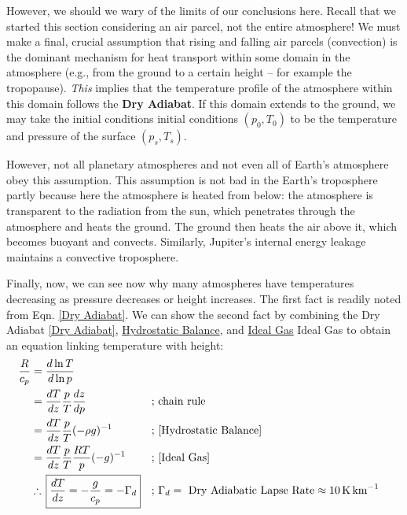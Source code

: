 However, we should we wary of the limits of our conclusions here. Recall that we started this section considering an air parcel, not the entire atmosphere! We must make a final, crucial assumption that rising and falling air parcels (convection) is the dominant mechanism for heat transport within some domain in the atmosphere (e.g., from the ground to a certain height – for example the tropopause). \textit{This} implies that the temperature profile of the atmosphere within this domain follows the \textbf{Dry Adiabat}. If this domain extends to the ground, we may take the initial conditions initial conditions $(p_0,T_0)$ to be the temperature and pressure of the surface $(p_s,T_s)$.

However, not all planetary atmospheres and not even all of Earth's atmosphere obey this assumption. This assumption is not bad in the Earth's troposphere partly because here the atmosphere is heated from below: the atmosphere is transparent to the radiation from the sun, which penetrates through the atmosphere and heats the ground. The ground then heats the air above it, which becomes buoyant and convects. Similarly, Jupiter's internal energy leakage maintains a convective troposphere.

Finally, now, we can see now why many atmospheres have temperatures decreasing as pressure decreases or height increases. The first fact is readily noted from Eqn. \ref{Dry Adiabat}. We can show the second fact by combining the Dry Adiabat \ref{Dry Adiabat}, \hyperref[Hydrostatic Balance]{Hydrostatic Balance}, and \hyperref[Ideal Gas]{Ideal Gas} Ideal Gas to obtain an equation linking temperature with height:
\begin{align*}
    \frac{R}{c_p}&=\frac{d\ln T}{d\ln p}
    \\
    &=\frac{d T}{d z}\frac{p}{T}\frac{dz}{d p}
    &\text{; }& \text{chain rule}\\
    &=\frac{d T}{d z}\frac{p}{T}(-\rho g)^{-1} 
    &\text{; }& \text{\ref{Hydrostatic Balance}}
    \\
    &=\frac{d T}{d z}\frac{p}{T}\frac{RT}{p}(- g)^{-1}
    &\text{; }& \text{\ref{Ideal Gas}}
    \\
    &\therefore\,
    \boxed{\frac{dT}{dz}=-\frac{g}{c_p} = -\Gamma_d} &\text{; }& \Gamma_d=\text{ Dry Adiabatic Lapse Rate}\approx\text{\qty{10}{\kelvin\per\kilo\metre}}
\end{align*}

